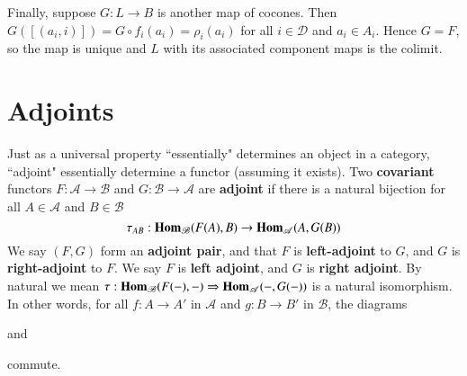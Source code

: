 \begin{example}
    Finally, suppose $G:L\rightarrow B$ is another map of cocones. Then $G([(a_i,i)]) = G\circ f_i(a_i) = \rho_i(a_i)$ for all $i \in \mathscr{D}$ and $a_i \in A_i$. Hence $G = F$, so the map is unique and $L$ with its associated component maps is the colimit.
\end{example}




\section{Adjoints}


Just as a universal property ``essentially" determines an object in a category, ``adjoint" essentially determine a functor (assuming it exists). Two \textbf{covariant} functors $F:\mathscr{A}\rightarrow \mathscr{B}$ and $G:\mathscr{B}\rightarrow \mathscr{A}$ are \textbf{adjoint} if there is a natural bijection for all $A \in \mathscr{A}$ and $B \in \mathscr{B}$ $$\tau_{AB}:\mathbf{Hom}_{\mathscr{B}}(F(A),B)\rightarrow \mathbf{Hom}_{\mathscr{A}}(A,G(B))$$
We say $(F,G)$ form an \textbf{adjoint pair}, and that $F$ is \textbf{left-adjoint} to $G$, and $G$ is \textbf{right-adjoint} to $F$. We say $F$ is \textbf{left adjoint}, and $G$ is \textbf{right adjoint}. By natural we mean $\tau:\mathbf{Hom}_{\mathscr{B}}(F(-),-)\Rightarrow \mathbf{Hom}_{\mathscr{A}}(-,G(-))$ is a natural isomorphism. In other words, for all $f:A\rightarrow A'$ in $\mathscr{A}$ and $g:B\rightarrow B'$ in $\mathscr{B}$, the diagrams
\begin{center}
\end{center}
and \begin{center}
\end{center}
commute. 

